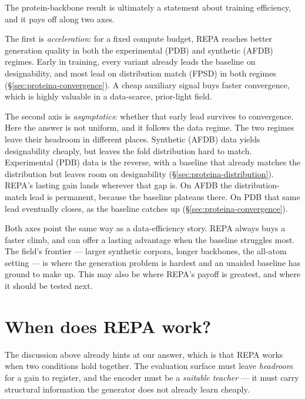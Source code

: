 \documentclass[12pt,a4paper,twoside]{report}
\begin{document}
The protein-backbone result is ultimately a statement about training efficiency, and it pays off along two axes.

The first is \emph{acceleration}: for a fixed compute budget, REPA reaches better generation quality in both the experimental (PDB) and synthetic (AFDB) regimes. Early in training, every variant already leads the baseline on designability, and most lead on distribution match (FPSD) in both regimes (\S\ref{sec:proteina-convergence}). A cheap auxiliary signal buys faster convergence, which is highly valuable in a data-scarce, prior-light field.

The second axis is \emph{asymptotics}: whether that early lead survives to convergence. Here the answer is not uniform, and it follows the data regime. The two regimes leave their headroom in different places. Synthetic (AFDB) data yields designability cheaply, but leaves the fold distribution hard to match. Experimental (PDB) data is the reverse, with a baseline that already matches the distribution but leaves room on designability (\S\ref{sec:proteina-distribution}). REPA's lasting gain lands wherever that gap is. On AFDB the distribution-match lead is permanent, because the baseline plateaus there. On PDB that same lead eventually closes, as the baseline catches up (\S\ref{sec:proteina-convergence}).

Both axes point the same way as a data-efficiency story. REPA always buys a faster climb, and can offer a lasting advantage when the baseline struggles most. The field's frontier --- larger synthetic corpora, longer backbones, the all-atom setting --- is where the generation problem is hardest and an unaided baseline has ground to make up. This may also be where REPA's payoff is greatest, and where it should be tested next.

\section{When does REPA work?}
\label{sec:concl-when}

The discussion above already hints at our answer, which is that REPA works when two
conditions hold together. The evaluation surface must leave \emph{headroom} for
a gain to register, and the encoder must be a \emph{suitable teacher} --- it
must carry structural information the generator does not already learn cheaply.
\end{document}

